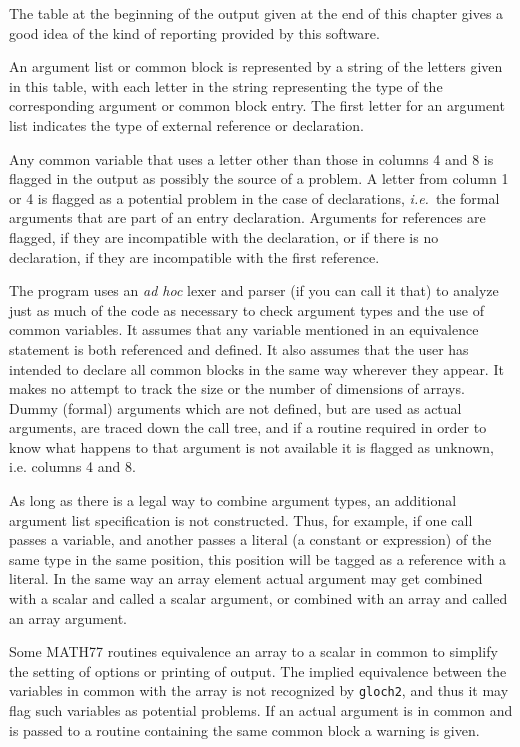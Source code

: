 \documentclass[twoside]{MATH77}
\begin{document}
The table at the beginning of the output given at the end of this chapter
gives a good idea of the kind of reporting provided by this software.

An argument list or common block is represented by a string of the letters
given in this table, with each letter in the string representing the type
of the corresponding argument or common block entry.  The first letter for
an argument list indicates the type of external reference or declaration.

Any common variable that uses a letter other than those in columns 4 and
8 is flagged in the output as possibly the source of a problem.  A letter
from column 1 or 4 is flagged as a potential problem in the case of
declarations, {\em i.e.}\ the formal arguments that are part of an entry
declaration.  Arguments for references are flagged, if they are
incompatible with the declaration, or if there is no declaration, if they
are incompatible with the first reference.

The program uses an {\em ad hoc} lexer and parser (if you can call it
that) to analyze just as much of the code as necessary to check argument
types and the use of common variables.  It assumes that any variable
mentioned in an equivalence statement is both referenced and defined.  It
also assumes that the user has intended to declare all common blocks in
the same way wherever they appear.  It makes no attempt to track the size
or the number of dimensions of arrays.  Dummy (formal) arguments which are
not defined, but are used as actual arguments, are traced down the call
tree, and if a routine required in order to know what happens to that
argument is not available it is flagged as unknown, i.e.  columns 4 and 8.

As long as there is a legal way to combine argument types, an additional
argument list specification is not constructed.  Thus, for example, if one
call passes a variable, and another passes a literal (a constant or
expression) of the same type in the same position, this position will be
tagged as a reference with a literal.  In the same way an array element
actual argument may get combined with a scalar and called a scalar
argument, or combined with an array and called an array argument.

Some MATH77 routines equivalence an array to a scalar in common to
simplify the setting of options or printing of output.  The implied
equivalence between the variables in common with the array is not
recognized by {\tt gloch2}, and thus it may flag such variables as
potential problems.  If an actual argument is in common and is passed to a
routine containing the same common block a warning is given.
\end{document}
